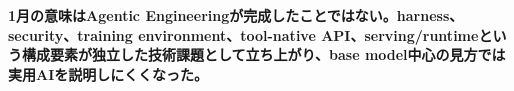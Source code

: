 \noindent\textbf{1月の意味はAgentic Engineeringが完成したことではない。harness、security、training environment、tool-native API、serving/runtimeという構成要素が独立した技術課題として立ち上がり、base model中心の見方では実用AIを説明しにくくなった。}\autocite{src-0d2abbb0fa62,src-3bc80a3c7870,src-85bc3e4f7b39,src-ae10eb4597fe,src-eac8dfbeb78c}

